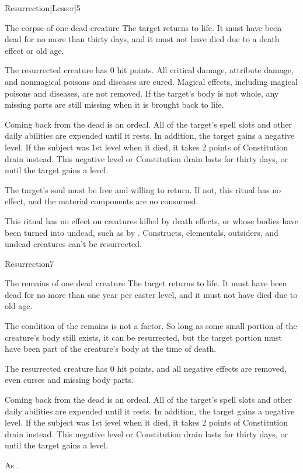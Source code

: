 \begin{spellsection}{Resurrection}[Lesser]{5}
\begin{spelltarget}{The corpse of one dead creature}
    \spelleffect The target returns to life. It must have been dead for no more than thirty days, and it must not have died due to a death effect or old age.

    The resurrected creature has 0 hit points. All critical damage, attribute damage, and nonmagical poisons and diseases are cured. Magical effects, including magical poisons and diseases, are not removed. If the target's body is not whole, any missing parts are still missing when it is brought back to life.

    \par Coming back from the dead is an ordeal. All of the target's spell slots and other daily abilities are expended until it rests. In addition, the target gains a negative level. If the subject was 1st level when it died, it takes 2 points of Constitution drain instead. This negative level or Constitution drain lasts for thirty days, or until the target gains a level.
\end{spelltarget}
\spellnotes The target's soul must be free and willing to return. If not, this ritual has no effect, and the material components are no consumed.

This ritual has no effect on creatures killed by death effects, or whose bodies have been turned into undead, such as by . Constructs, elementals, outsiders, and undead creatures can't be resurrected.
\end{spellsection}

\begin{spellsection}{Resurrection}{7}
\begin{spelltarget}{The remains of one dead creature}
    \spelleffect The target returns to life. It must have been dead for no more than one year per caster level, and it must not have died due to old age.

    The condition of the remains is not a factor. So long as some small portion of the creature's body still exists, it can be resurrected, but the target portion must have been part of the creature's body at the time of death. 

    The resurrected creature has 0 hit points, and all negative effects are removed, even curses and missing body parts.

    \par Coming back from the dead is an ordeal. All of the target's spell slots and other daily abilities are expended until it rests. In addition, the target gains a negative level. If the subject was 1st level when it died, it takes 2 points of Constitution drain instead. This negative level or Constitution drain lasts for thirty days, or until the target gains a level.
\end{spelltarget}
\spellnotes As .
\end{spellsection}

